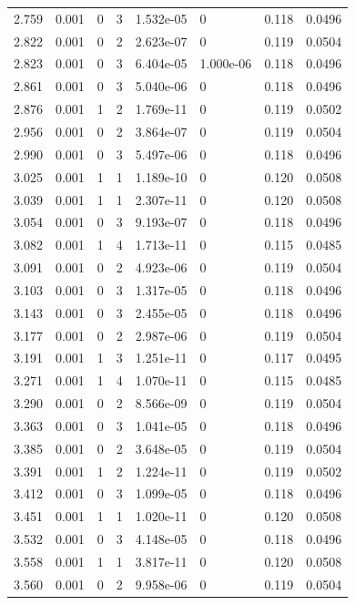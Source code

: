 \documentclass[preview]{standalone}
\begin{document}
{{{\begin{tabular}{L{1.2cm}C{1.2cm} C{0.3cm}C{0.5cm} C{1.4cm}C{1.4cm} C{1.4cm}C{1.4cm}}
  2.759  &  0.001  & 0     &  3 &  1.532e-05  & 0  & 0.118 &  0.0496   \\ 
  2.822  &  0.001  & 0     &  2 &  2.623e-07  & 0  & 0.119 &  0.0504   \\ 
  2.823  &  0.001  & 0     &  3 &  6.404e-05  & 1.000e-06  & 0.118 &  0.0496   \\ 
  2.861  &  0.001  & 0     &  3 &  5.040e-06  & 0  & 0.118 &  0.0496   \\ 
  2.876  &  0.001  & 1     &  2 &  1.769e-11  & 0  & 0.119 &  0.0502   \\ 
  2.956  &  0.001  & 0     &  2 &  3.864e-07  & 0  & 0.119 &  0.0504   \\ 
  2.990  &  0.001  & 0     &  3 &  5.497e-06  & 0  & 0.118 &  0.0496   \\ 
  3.025  &  0.001  & 1     &  1 &  1.189e-10  & 0  & 0.120 &  0.0508   \\ 
  3.039  &  0.001  & 1     &  1 &  2.307e-11  & 0  & 0.120 &  0.0508   \\ 
  3.054  &  0.001  & 0     &  3 &  9.193e-07  & 0  & 0.118 &  0.0496   \\ 
  3.082  &  0.001  & 1     &  4 &  1.713e-11  & 0  & 0.115 &  0.0485   \\ 
  3.091  &  0.001  & 0     &  2 &  4.923e-06  & 0  & 0.119 &  0.0504   \\ 
  3.103  &  0.001  & 0     &  3 &  1.317e-05  & 0  & 0.118 &  0.0496   \\ 
  3.143  &  0.001  & 0     &  3 &  2.455e-05  & 0  & 0.118 &  0.0496   \\ 
  3.177  &  0.001  & 0     &  2 &  2.987e-06  & 0  & 0.119 &  0.0504   \\ 
  3.191  &  0.001  & 1     &  3 &  1.251e-11  & 0  & 0.117 &  0.0495   \\ 
  3.271  &  0.001  & 1     &  4 &  1.070e-11  & 0  & 0.115 &  0.0485   \\ 
  3.290  &  0.001  & 0     &  2 &  8.566e-09  & 0  & 0.119 &  0.0504   \\ 
  3.363  &  0.001  & 0     &  3 &  1.041e-05  & 0  & 0.118 &  0.0496   \\ 
  3.385  &  0.001  & 0     &  2 &  3.648e-05  & 0  & 0.119 &  0.0504   \\ 
  3.391  &  0.001  & 1     &  2 &  1.224e-11  & 0  & 0.119 &  0.0502   \\ 
  3.412  &  0.001  & 0     &  3 &  1.099e-05  & 0  & 0.118 &  0.0496   \\ 
  3.451  &  0.001  & 1     &  1 &  1.020e-11  & 0  & 0.120 &  0.0508   \\ 
  3.532  &  0.001  & 0     &  3 &  4.148e-05  & 0  & 0.118 &  0.0496   \\ 
  3.558  &  0.001  & 1     &  1 &  3.817e-11  & 0  & 0.120 &  0.0508   \\ 
  3.560  &  0.001  & 0     &  2 &  9.958e-06  & 0  & 0.119 &  0.0504   \\ 
\hline 
\end{tabular} 

}}}
\end{document}
